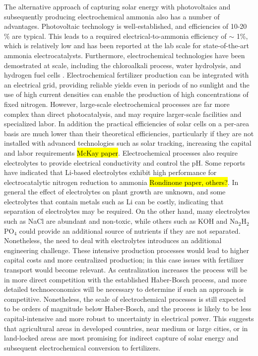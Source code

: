 The alternative approach of capturing solar energy with photovoltaics and subsequently producing electrochemical ammonia also has a number of advantages. Photovoltaic technology is well-established, and efficiencies of 10-20 \% are typical. This leads to a required electrical-to-ammonia efficiency of $\sim$ 1\%, which is relatively low and has been reported at the lab scale for state-of-the-art ammonia electrocatalysts. Furthermore, electrochemical technologies have been demostrated at scale, including the chloroalkali process, water hydrolysis, and hydrogen fuel cells \needcite. Electrochemical fertilizer production can be integrated with an electrical grid, providing reliable yields even in periods of no sunlight and the use of high current densities can enable the production of high concentrations of fixed nitrogen. However, large-scale electrochemical processes are far more complex than direct photocatalysis, and may require larger-scale facilities and specialized labor. In addition the practical efficiencies of solar cells on a per-area basis are much lower than their theoretical efficiencies, particularly if they are not installed with advanced technologies such as solar tracking, increasing the capital and labor requirements \needcite \hl{McKay paper}. Electrochemical processes also require electrolytes to provide electrical conductivity and control the pH. Some reports have indicated that Li-based electrolytes exhibit high performance for electrocatalytic nitrogen reduction to ammonia \needcite \hl{Rondinone paper, others?}. In general the effect of electrolytes on plant growth are unknown, and some electrolytes that contain metals such as Li can be costly, indicating that separation of electrolytes may be required. On the other hand, many electrolytes such as NaCl are abundant and non-toxic, while others such as KOH and Na$_2$H$_2$PO$_4$ could provide an additional source of nutrients if they are not separated. Nonetheless, the need to deal with electrolytes introduces an additional engineering challenge. These intensive production processes would lead to higher capital costs and more centralized production; in this case issues with fertilizer transport would become relevant. As centralization increases the process will be in more direct competition with the established Haber-Bosch process, and more detailed technoeconomics will be necessary to determine if such an approach is competitive. Nonetheless, the scale of electrochemical processes is still expected to be orders of magnitude below Haber-Bosch, and the process is likely to be less capital-intensive and more robust to uncertainty in electrical power. This suggests that agricultural areas in developed countries, near medium or large cities, or in land-locked areas are most promising for indirect capture of solar energy and subsequent electrochemical conversion to fertilizers.

